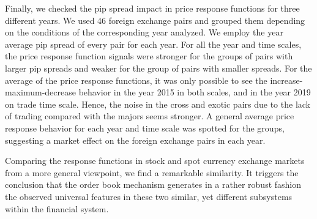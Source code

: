 Finally, we checked the pip spread impact in price response functions for three
different years. We used 46 foreign exchange pairs and grouped them depending
on the conditions of the corresponding year analyzed. We employ the year
average pip spread of every pair for each year. For all the year and time
scales, the price response function signals were stronger for the groups of
pairs with larger pip spreads and weaker for the group of pairs with smaller
spreads. For the average of the price response functions, it was only possible
to see the increase-maximum-decrease behavior in the year 2015 in both scales,
and in the year 2019 on trade time scale. Hence, the noise in the cross and
exotic pairs due to the lack of trading compared with the majors seems
stronger. A general average price response behavior for each year and time
scale was spotted for the groups, suggesting a market effect on the foreign
exchange pairs in each year.

Comparing the response functions in stock and spot currency exchange markets
from a more general viewpoint, we find a remarkable similarity. It triggers the
conclusion that the order book mechanism generates in a rather robust fashion
the observed universal features in these two similar, yet different subsystems
within the financial system.